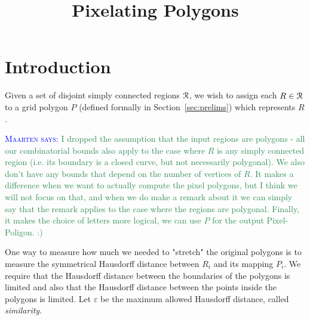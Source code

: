 \documentclass[a4paper,UKenglish,cleveref]{lipics-v2019}
\title{Pixelating Polygons}
\newcommand{\mremark}[3]{\textcolor{blue}{\textsc{#1 #2:}} \textcolor{SeaGreen}{\textsf{#3}}}
\newcommand{\maarten}[2][says]{\mremark{Maarten}{#1}{#2}}
\newcommand{\pix}{\scalebox{0.6}{$\square$}}
\newcommand{\eps}{\varepsilon}
\begin{document}
\maketitle

\section{Introduction}

Given a set of disjoint simply connected regions $\cal R$, we wish to assign each $R \in \cal R$ to a grid polygon $P$ (defined formally in Section~\ref {sec:prelims}) which represents $R$.

\maarten {I dropped the assumption that the input regions are polygons - all our combinatorial bounds also apply to the case where $R$ is any simply connected region (i.e. its boundary is a closed curve, but not necessarily polygonal). We also don't have any bounds that depend on the number of vertices of $R$. It makes a difference when we want to actually compute the pixel polygons, but I think we will not focus on that, and when we do make a remark about it we can simply say that the remark applies to the case where the regions are polygonal.  Finally, it makes the choice of letters more logical, we can use $P$ for the output Pixel-Poligon. :)}



One way to measure how much we needed to "stretch" the original polygons is to measure the symmetrical Hausdorff distance between $R_i$ and its mapping $P_i$.
We require that the Hausdorff distance between the boundaries of the polygons is limited and also that the Hausdorff distance between the points inside the polygons is limited.
Let $\eps$ be the maximum allowed Hausdorff distance, called \emph{similarity}.
\end{document}
